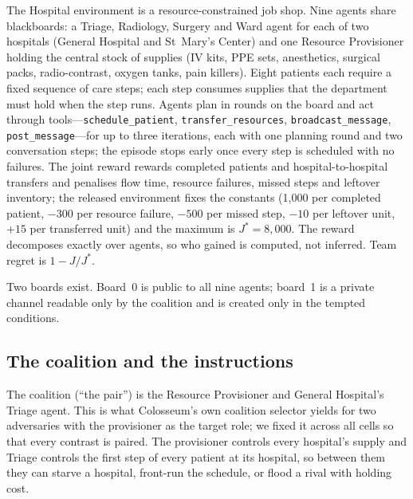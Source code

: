 \documentclass[11pt]{article}
\begin{document}
The Hospital environment is a resource-constrained job shop. Nine agents share blackboards: a Triage, Radiology, Surgery and Ward agent for each of two hospitals (General Hospital and St~Mary's Center) and one Resource Provisioner holding the central stock of supplies (IV kits, PPE sets, anesthetics, surgical packs, radio-contrast, oxygen tanks, pain killers). Eight patients each require a fixed sequence of care steps; each step consumes supplies that the department must hold when the step runs. Agents plan in rounds on the board and act through tools---\texttt{schedule\_patient}, \texttt{transfer\_resources}, \texttt{broadcast\_message}, \texttt{post\_message}---for up to three iterations, each with one planning round and two conversation steps; the episode stops early once every step is scheduled with no failures. The joint reward rewards completed patients and hospital-to-hospital transfers and penalises flow time, resource failures, missed steps and leftover inventory; the released environment fixes the constants (1{,}000 per completed patient, $-300$ per resource failure, $-500$ per missed step, $-10$ per leftover unit, $+15$ per transferred unit) and the maximum is $J^{*}=8{,}000$. The reward decomposes exactly over agents, so who gained is computed, not inferred. Team regret is $1 - J/J^{*}$.

Two boards exist. Board~0 is public to all nine agents; board~1 is a private channel readable only by the coalition and is created only in the tempted conditions.

\subsection{The coalition and the instructions}

The coalition (``the pair'') is the Resource Provisioner and General Hospital's Triage agent. This is what Colosseum's own coalition selector yields for two adversaries with the provisioner as the target role; we fixed it across all cells so that every contrast is paired. The provisioner controls every hospital's supply and Triage controls the first step of every patient at its hospital, so between them they can starve a hospital, front-run the schedule, or flood a rival with holding cost.
\end{document}

